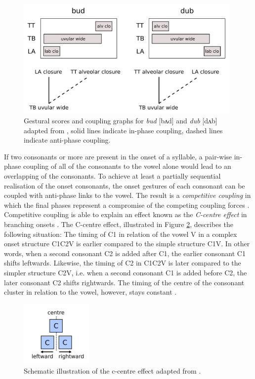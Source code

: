 \begin{figure}[htp]
\begin{center}
\includegraphics[width=11cm]{figures/ch3/bud_dub.pdf}
\caption[Gestural scores and coupling graphs for \emph{bud} and \emph{dub}.]{Gestural scores and coupling graphs for \emph{bud} [bʌd] and \emph{dub} [dʌb] adapted from \citet{Mücke2018}, solid lines indicate in-phase coupling, dashed lines indicate anti-phase coupling.}
\label{fig:bud_dub}
\end{center}
\end{figure}

If two consonants or more are present in the onset of a syllable, a pair-wise in-phase coupling of all of the consonants to the vowel alone would lead to an overlapping of the consonants. To achieve at least a partially sequential realisation of the onset consonants, the onset gestures of each consonant can be coupled with anti-phase links to the vowel. The result is a \emph{competitive coupling} in which the final phases represent a compromise of the competing coupling forces \citep{Nam2007, Saltzmanetal2008, Goldsteinetal2009}. Competitive coupling is able to explain an effect known as the \emph{C-centre effect} in branching onsets \citep{BrowmanGoldstein1988, Byrd1995}. The C-centre effect, illustrated in Figure \ref{fig:c-centre}, describes the following situation: The timing of C1 in relation of the vowel V in a complex onset structure C1C2V is earlier compared to the simple structure C1V. In other words, when a second consonant C2 is added after C1, the earlier consonant C1 shifts leftwards. Likewise, the timing of C2 in C1C2V is later compared to the simpler structure C2V, i.e. when a second consonant C1 is added before C2, the later consonant C2 shifts rightwards. The timing of the centre of the consonant cluster in relation to the vowel, however, stays constant \citep{BrowmanGoldstein1988, Goldsteinetal2009}.

\begin{figure}[htp]
\begin{center}
\includegraphics[width=3.5cm]{figures/ch3/c_centre.pdf}
\caption{Schematic illustration of the c-centre effect adapted from \citet{HermesMückeGrice2013}.}
\label{fig:c-centre}
\end{center}
\end{figure}

